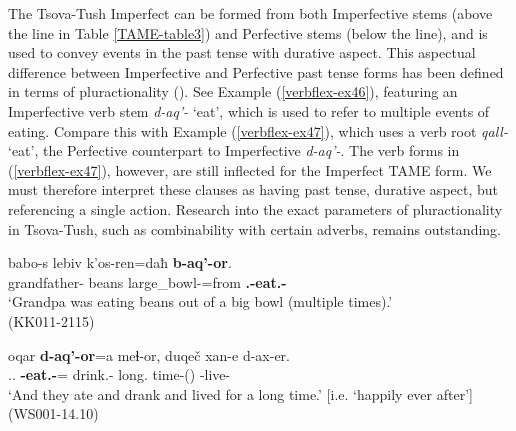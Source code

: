 The Tsova-Tush Imperfect can be formed from both Imperfective stems (above the line in Table \ref{TAME-table3}) and Perfective stems (below the line), and is used to convey events in the past tense with durative aspect. This aspectual difference between Imperfective and Perfective past tense forms has been defined in terms of pluractionality (\cite[179]{holiskygagua}). See Example (\ref{verbflex-ex46}), featuring an Imperfective verb stem \textit{d-aq'-} `eat', which is used to refer to multiple events of eating. Compare this with Example (\ref{verbflex-ex47}), which uses a verb root \textit{qall-} `eat', the Perfective counterpart to Imperfective \textit{d-aq'-}. The verb forms in (\ref{verbflex-ex47}), however, are still inflected for the Imperfect TAME form. We must therefore interpret these clauses as having past tense, durative aspect, but referencing a single action. Research into the exact parameters of pluractionality in Tsova-Tush, such as combinability with certain adverbs, remains outstanding.

\begin{exe}
	\ex\label{verbflex-ex46}
	\begin{xlist}
		
		
			\ex\label{verbflex-ex46a}
			\gll babo-s lebiv k'os-ren=daħ \textbf{b-aq'-or}. \\
			grandfather-{\Erg} beans large\_bowl-{\Abl}=from \textbf{{\B}.{\Sg}-eat.{\Ipfv}-{\Imprf}} \\
			\trans `Grandpa was eating beans out of a big bowl (multiple times).' \\
			\hfill (KK011-2115)
		
		
		
			\ex\label{verbflex-ex46b}
			\gll oqar \textbf{d-aq'-or}=a meɬ-or, duqeč xan-e d-ax-er. \\
			{\Dist}.{\Pl}.{\Erg} \textbf{{\D}-eat.{\Ipfv}-{\Imprf}}={\Add} drink.{\Ipfv}-{\Imprf} long.{\Obl} time-{\Obl}({\Ess}) {\D}-live-{\Imprf}  \\
			\trans `And they ate and drank and lived for a long time.' [i.e. `happily ever after']
			\hfill (WS001-14.10)
		
		
	\end{xlist}
\end{exe}

